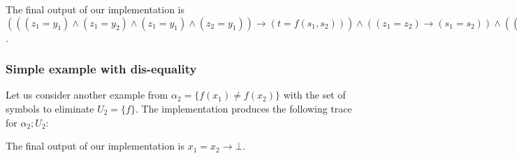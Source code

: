 


The final output of our implementation is 
$(((z_1 = y_1) \land (z_1 = y_2) \land (z_1 = y_1) \land (z_2 = y_1)) \rightarrow (t = f(s_1, s_2))) \land
((z_1 = z_2) \rightarrow (s_1 = s_2)) \land
(((z_2 = y_1) \land (z_1 = y_2) \land (z_1 = y_1) \land (z_2 = y_1)) \rightarrow (t = f(s_2, s_2))) \land
(((z_2 = y_1) \land (z_1 = y_2)) \rightarrow (t = f(s_2, s_1))) \land
(((z_1 = y_1) \land (z_1 = y_2)) \rightarrow (t = f(s_1, s_1)))$.

\subsubsection{Simple example with dis-equality}

Let us consider another example from \cite{KAPUR2017} 
$\alpha_2 = \{f(x_1) \neq f(x_2)\}$
with the set of symbols to eliminate $U_2 = \{f\}$. The implementation produces the following
trace for $\alpha_2; U_2$:



The final output of our implementation is $x_1 = x_2 \rightarrow \bot$.






